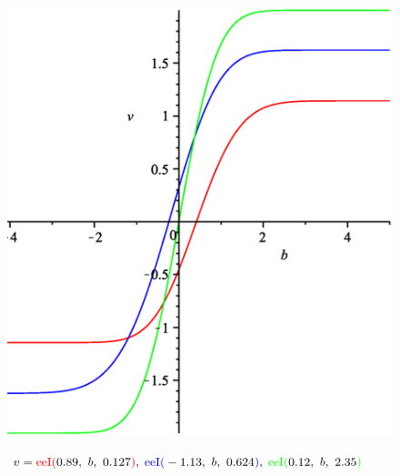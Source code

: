 \documentclass[12pt,reqno,intlimits,twoside]{amsart}
\DeclareMathOperator{\eeI}{eeI}%
\begin{document}
\newpage
\begin{figure}[!h]
  \includegraphics{ErfExpInt_b}\\
  \caption{$v=\textcolor{red}{\eeI(}0.89,\ b,\ 0.127\textcolor{red}{)},\;
              \textcolor{blue}{\eeI(}-1.13,\ b,\ 0.624\textcolor{blue}{)},\;
              \textcolor{green}{\eeI(}0.12,\ b,\ 2.35\textcolor{green}{)}
           $
          }\label{FigErfExpInt_b}
\end{figure}
\end{document}
